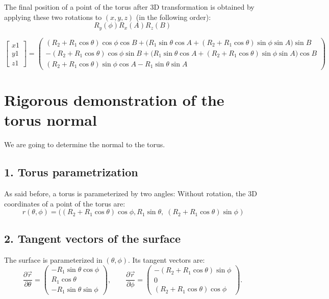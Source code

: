 \documentclass{article}
\begin{document}
The final position of a point of the torus after 3D transformation is obtained by applying these two rotations to $(x,y,z)$ (in the following order): \[
R_y(\phi)R_x(A)R_z (B )
\]

\[
\begin{bmatrix}
x1 \\
y1 \\
z1
\end{bmatrix}
=
\begin{pmatrix}
(R_2 + R_1 \cos\theta)\cos\phi \cos B + \big(R_1 \sin\theta \cos A + (R_2 + R_1 \cos\theta)\sin\phi \sin A\big)\sin B \\[1mm]
-(R_2 + R_1 \cos\theta)\cos\phi \sin B + \big(R_1 \sin\theta \cos A + (R_2 + R_1 \cos\theta)\sin\phi \sin A\big)\cos B \\[1mm]
(R_2 + R_1 \cos\theta)\sin\phi \cos A - R_1 \sin\theta \sin A
\end{pmatrix}
\]


\section*{Rigorous demonstration of the torus normal}

We are going to determine the normal to the torus.

\subsection*{1. Torus parametrization}

As said before, a torus is parameterized by two angles: 
Without rotation, the 3D coordinates of a point of the torus are:
\[
r(\theta, \phi) = 
\big( (R_2 + R_1 \cos\theta)\cos\phi,R_1 \sin\theta,\; (R_2 + R_1 \cos\theta)\sin\phi\;  \big)
\]

\subsection*{2. Tangent vectors of the surface}

The surface is parameterized in \((\theta, \phi)\).  
Its tangent vectors are:
\[
\frac{\partial \vec{r}}{\partial \theta} =
\begin{pmatrix}
- R_1 \sin\theta \cos\phi \\
R_1 \cos\theta\\
- R_1 \sin\theta \sin\phi 

\end{pmatrix},
\qquad
 \frac{\partial \vec{r}}{\partial \phi} =
\begin{pmatrix}
- (R_2 + R_1 \cos\theta) \sin\phi \\
0\\
(R_2 + R_1 \cos\theta) \cos\phi 
\end{pmatrix}.
\]
\end{document}
